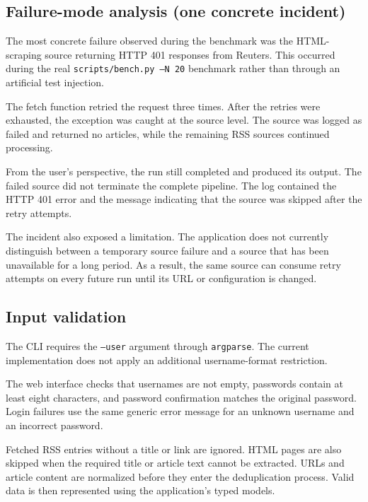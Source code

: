 \documentclass[11pt,a4paper]{article}
\begin{document}
\subsection{Failure-mode analysis (one concrete incident)}

The most concrete failure observed during the benchmark was the HTML-scraping source returning HTTP 401 responses from Reuters. This occurred during the real \texttt{scripts/bench.py --N 20} benchmark rather than through an artificial test injection.

The fetch function retried the request three times. After the retries were exhausted, the exception was caught at the source level. The source was logged as failed and returned no articles, while the remaining RSS sources continued processing.

From the user's perspective, the run still completed and produced its output. The failed source did not terminate the complete pipeline. The log contained the HTTP 401 error and the message indicating that the source was skipped after the retry attempts.

The incident also exposed a limitation. The application does not currently distinguish between a temporary source failure and a source that has been unavailable for a long period. As a result, the same source can consume retry attempts on every future run until its URL or configuration is changed.

\subsection{Input validation}

The CLI requires the \texttt{--user} argument through \texttt{argparse}. The current implementation does not apply an additional username-format restriction.

The web interface checks that usernames are not empty, passwords contain at least eight characters, and password confirmation matches the original password. Login failures use the same generic error message for an unknown username and an incorrect password.

Fetched RSS entries without a title or link are ignored. HTML pages are also skipped when the required title or article text cannot be extracted. URLs and article content are normalized before they enter the deduplication process. Valid data is then represented using the application's typed models.
\end{document}

